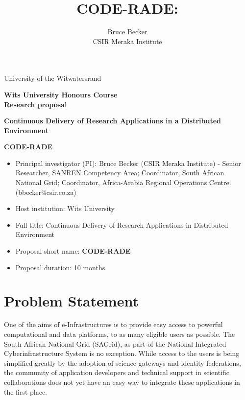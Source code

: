 \documentclass[oneside, a4paper, onecolumn, 11pt]{article}
\title{CODE-RADE:\\ }
\author{Bruce Becker\\ CSIR Meraka Institute}
\begin{document}
\noindent
University of the Witwatersrand

\vfill

\begin{center}
\large{\textbf{Wits University Honours Course\\
Research proposal }
}
\vfill

\LARGE{\textbf{Continuous Delivery of Research Applications in a Distributed Environment }}

\vfill

\LARGE{\textbf{CODE-RADE}}

\vfill

\end{center}

\vfill

\begin{itemize}
\item Principal investigator (PI): Bruce Becker (CSIR Meraka Institute) - Senior Researcher, SANREN Competency Area; Coordinator, South African National Grid; Coordinator, Africa-Arabia Regional Operations Centre. (bbecker@csir.co.za)
\item Host institution: Wits University
\item Full title: Continuous Delivery of Research Applications in Distributed Environment
\item Proposal short name: \bf{CODE-RADE}
\item Proposal duration: 10 months
\end{itemize}


\vfill

\noindent
\section{Problem Statement}
One of the aims of e-Infrastructures is to provide easy access to powerful computational and data platforms, to as many eligible users as possible. The South African National Grid (SAGrid), as part of the National Integrated Cyberinfrastructure System is no exception. While access to the users is being simplified greatly by the adoption of science gateways and identity federations, the community of application developers and technical support in scientific collaborations does not yet have an easy way to integrate these applications in the first place.
\end{document}
